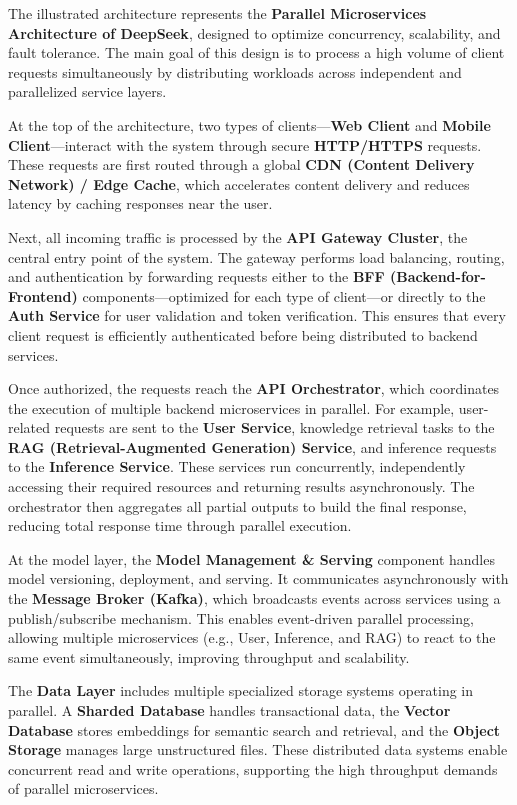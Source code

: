 \documentclass[a4paper,11pt]{article}
\begin{document}
\vspace{0.5cm}

The illustrated architecture represents the \textbf{Parallel Microservices Architecture of DeepSeek}, designed to optimize concurrency, scalability, and fault tolerance. The main goal of this design is to process a high volume of client requests simultaneously by distributing workloads across independent and parallelized service layers.

At the top of the architecture, two types of clients—\textbf{Web Client} and \textbf{Mobile Client}—interact with the system through secure \textbf{HTTP/HTTPS} requests. These requests are first routed through a global \textbf{CDN (Content Delivery Network) / Edge Cache}, which accelerates content delivery and reduces latency by caching responses near the user.

Next, all incoming traffic is processed by the \textbf{API Gateway Cluster}, the central entry point of the system. The gateway performs load balancing, routing, and authentication by forwarding requests either to the \textbf{BFF (Backend-for-Frontend)} components—optimized for each type of client—or directly to the \textbf{Auth Service} for user validation and token verification. This ensures that every client request is efficiently authenticated before being distributed to backend services.

Once authorized, the requests reach the \textbf{API Orchestrator}, which coordinates the execution of multiple backend microservices in parallel. For example, user-related requests are sent to the \textbf{User Service}, knowledge retrieval tasks to the \textbf{RAG (Retrieval-Augmented Generation) Service}, and inference requests to the \textbf{Inference Service}. These services run concurrently, independently accessing their required resources and returning results asynchronously. The orchestrator then aggregates all partial outputs to build the final response, reducing total response time through parallel execution.

At the model layer, the \textbf{Model Management \& Serving} component handles model versioning, deployment, and serving. It communicates asynchronously with the \textbf{Message Broker (Kafka)}, which broadcasts events across services using a publish/subscribe mechanism. This enables event-driven parallel processing, allowing multiple microservices (e.g., User, Inference, and RAG) to react to the same event simultaneously, improving throughput and scalability.

The \textbf{Data Layer} includes multiple specialized storage systems operating in parallel. A \textbf{Sharded Database} handles transactional data, the \textbf{Vector Database} stores embeddings for semantic search and retrieval, and the \textbf{Object Storage} manages large unstructured files. These distributed data systems enable concurrent read and write operations, supporting the high throughput demands of parallel microservices.
\end{document}
